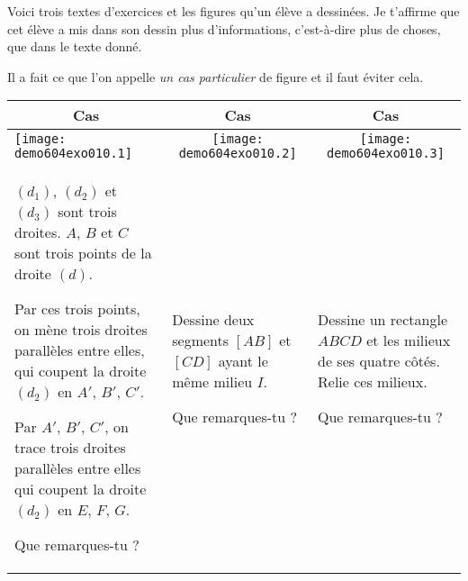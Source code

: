 \og Voici trois textes d'exercices et les figures qu'un élève a dessinées. Je t'affirme que cet élève a mis dans son dessin plus d'informations, c'est-à-dire plus de choses, que dans le texte donné.\par Il a fait ce que l'on appelle {\em un cas particulier} de figure et il faut éviter cela.\fg
\begin{center}
  \begin{tabular}{|m{7cm}|m{5cm}|m{4cm}|}
    \hline
    \multicolumn{1}{|c|}{Cas \no1}&\multicolumn{1}{c|}{Cas \no2}&\multicolumn{1}{c|}{Cas \no3}\\
    \hline
\texttt{[image: demo604exo010.1]}&\multicolumn{1}{c|}{\texttt{[image: demo604exo010.2]}}&\multicolumn{1}{c|}{\texttt{[image: demo604exo010.3]}}\\
\hline
    $(d_1)$, $(d_2)$ et $(d_3)$ sont trois droites. $A$, $B$ et $C$ sont trois points de la droite $(d)$.\par
Par ces trois points, on mène trois droites parallèles entre elles, qui coupent la droite $(d_2)$ en $A'$, $B'$, $C'$.
\par Par $A'$, $B'$, $C'$, on trace trois droites parallèles entre elles qui coupent la droite $(d_2)$ en $E$, $F$, $G$.
\par Que remarques-tu ?
&Dessine deux segments $[AB]$ et $[CD]$ ayant le même milieu $I$.
\par Que remarques-tu ?
&Dessine un rectangle $ABCD$ et les milieux de ses quatre côtés. Relie ces milieux.
\par Que remarques-tu ?\\
\hline
  \end{tabular}
\end{center}